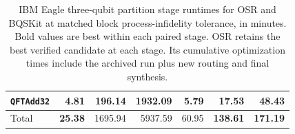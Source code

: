\begin{table}[p]
\begin{tabular}{l|rrr|rrr}
\texttt{QFTAdd32} & \textbf{4.81} & 196.14 & 1932.09 & 5.79 & \textbf{17.53} & \textbf{48.43} \\
\hline
Total & \textbf{25.38} & 1695.94 & 5937.59 & 60.95 & \textbf{138.61} & \textbf{171.19} \\
\hline
\end{tabular}
\caption{IBM Eagle three-qubit partition stage runtimes for OSR and BQSKit at matched block process-infidelity tolerance, in minutes. Bold values are best within each paired stage. OSR retains the best verified candidate at each stage. Its cumulative optimization times include the archived run plus new routing and final synthesis.}
\label{tab:osr-bqskit-three-qubit-ibm-eagle-times}
\end{table}


